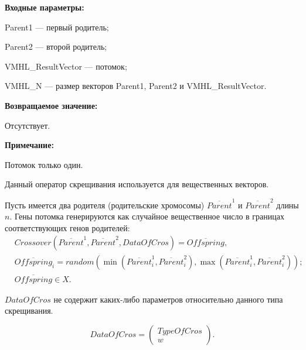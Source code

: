 \textbf{Входные параметры:}
 
Parent1 --- первый родитель;
 
Parent2 --- второй родитель;
 
VMHL\_ResultVector --- потомок;

 
VMHL\_N --- размер векторов Parent1, Parent2 и VMHL\_ResultVector.

\textbf{Возвращаемое значение:}

 Отсутствует.
 
\textbf{ Примечание:}

 Потомок только один.
 
Данный оператор скрещивания используется для вещественных векторов.

Пусть имеется два родителя (родительские хромосомы) $ \overline{Parent}^1 $ и $ \overline{Parent}^2$ длины $n$. Гены потомка генерируются как случайное вещественное число в границах соответствующих генов родителей:
\begin{align}
\label{SetOfOperatorsAlgorithms:eq:FlatCrossoverForReal}
&Crossover \left( \overline{Parent}^1, \overline{Parent}^2, DataOfCros\right)= \overline{Offspring}, \\
& \overline{Offspring}_i=random\left(\min\left(\overline{Parent}^1_i, \overline{Parent}^2_i \right),\max\left(\overline{Parent}^1_i, \overline{Parent}^2_i \right)  \right);\nonumber\\
&\overline{Offspring}\in X.\nonumber
\end{align}

$ DataOfCros $ не содержит каких-либо параметров относительно данного типа скрещивания.

\begin{equation}
DataOfCros=\left( \begin{array}{c} TypeOfCros \\ w \end{array} \right).
\end{equation}